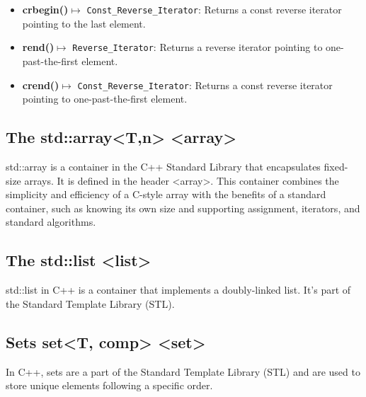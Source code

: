 \documentclass{report}
\begin{document}
\begin{concept}
\begin{notebox}
\begin{itemize}
            \item \textbf{crbegin()}\(\mapsto\) \texttt{Const\_Reverse\_Iterator}: Returns a const reverse iterator pointing to the last element.
            \item \textbf{rend()}\(\mapsto\) \texttt{Reverse\_Iterator}: Returns a reverse iterator pointing to one-past-the-first element.
            \item \textbf{crend()}\(\mapsto\) \texttt{Const\_Reverse\_Iterator}: Returns a const reverse iterator pointing to one-past-the-first element.
       \end{itemize}
    \end{notebox}
    

    \pagebreak
    \subsection{The std::array<T,n> <array>}
    \bigbreak \noindent 
    \begin{concept}
     std::array is a container in the C++ Standard Library that encapsulates fixed-size arrays. It is defined in the header <array>. This container combines the simplicity and efficiency of a C-style array with the benefits of a standard container, such as knowing its own size and supporting assignment, iterators, and standard algorithms.       
    \end{concept}

    \bigbreak \noindent 
    \subsection{The std::list <list>}
    \bigbreak \noindent 
    \begin{concept}
       std::list in C++ is a container that implements a doubly-linked list. It's part of the Standard Template Library (STL). 
    \end{concept}
    

    \bigbreak \noindent 
    \subsection{Sets set<T, comp> <set>}
    \bigbreak \noindent 
    \begin{concept}
        In C++, sets are a part of the Standard Template Library (STL) and are used to store unique elements following a specific order.
    \end{concept}

    \bigbreak \noindent 

\end{concept}
\end{document}

